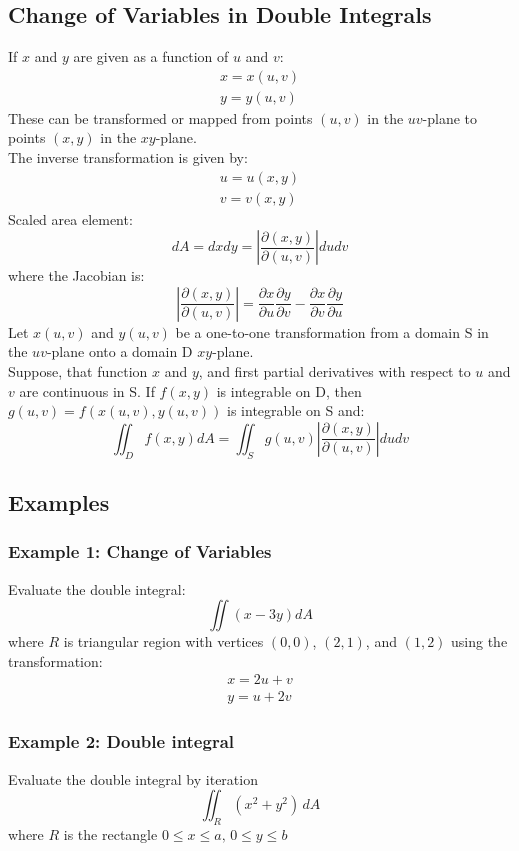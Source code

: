 \subsection{Change of Variables in Double Integrals}
If $x$ and $y$ are given as a function of $u$ and $v$:
$$\begin{array}{c}
x=x(u,v)\\
y=y(u,v)
\end{array}$$
These can be transformed or mapped from points $(u,v)$ in the $uv$-plane to points $(x,y)$ in the $xy$-plane.\\
The inverse transformation is given by:
$$\begin{array}{c}
  u=u(x,y)\\
  v=v(x,y)
\end{array}$$
Scaled area element:
$$dA = dxdy=\left|\frac{\partial(x,y)}{\partial(u,v)}\right|dudv$$
where the Jacobian is:
$$\left|\frac{\partial(x,y)}{\partial(u,v)}\right|=\frac{\partial x}{\partial u}\frac{\partial y}{\partial v}-\frac{\partial x}{\partial v}\frac{\partial y}{\partial u}$$
Let $x(u, v)$ and $y(u,v)$ be a one-to-one transformation from a domain S in the $uv$-plane onto a domain D
$xy$-plane.\\
Suppose, that function $x$ and $y$, and first partial derivatives with respect to $u$ and $v$ are continuous in S.
If $f(x,y)$ is integrable on D, then $g(u,v)=f(x(u,v),y(u,v))$ is integrable on S and:
$$\iint_D f(x,y)dA=\iint_S g(u,v)\left|\frac{\partial(x,y)}{\partial(u,v)}\right|dudv$$

\subsection{Examples}
\subsubsection{Example 1: Change of Variables}
Evaluate the double integral:
$$\iint (x-3y)dA$$
where $R$ is triangular region with vertices $(0,0)$, $(2,1)$, and $(1,2)$ using the transformation:
$$\begin{array}{c}
  x=2u+v\\
  y=u+2v
\end{array}$$

\subsubsection{Example 2: Double integral}
Evaluate the double integral by iteration
$$\iint_{R}(x^{2}+y^{2})\,d A$$
where $R$ is the rectangle $0\leq x\leq a,\,0\leq y\leq b$
